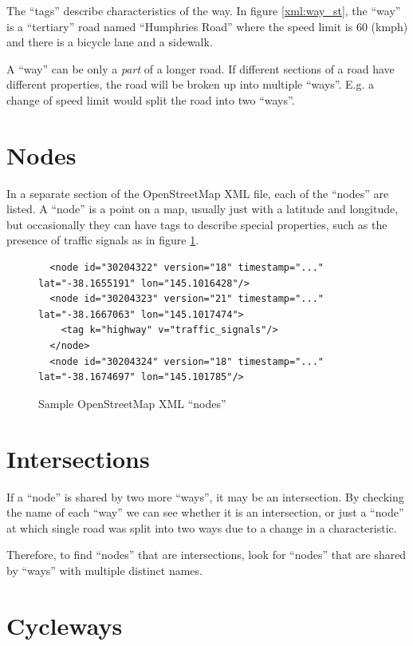 \documentclass[11pt,twoside]{report}
\begin{document}
The ``tags'' describe characteristics of the way.  In figure \ref{xml:way_st}, the ``way'' is a ``tertiary'' road named ``Humphries Road'' where the speed limit is 60 (kmph) and there is a bicycle lane and a sidewalk.

A ``way'' can be only a \textit{part} of a longer road.  If different sections of a road have different properties, the road will be broken up into multiple ``ways''.  E.g. a change of speed limit would split the road into two ``ways''.

\clearpage
\section{Nodes}
\label{osm:nodes}

In a separate section of the OpenStreetMap XML file, each of the ``nodes'' are listed.  A ``node'' is a point on a map, usually just with a latitude and longitude, but occasionally they can have tags to describe special properties, such as the presence of traffic signals as in figure \ref{xml:way_nodes}.\\

\begin{figure}[h]
\centering
\begin{verbatim}
  <node id="30204322" version="18" timestamp="..." lat="-38.1655191" lon="145.1016428"/>
  <node id="30204323" version="21" timestamp="..." lat="-38.1667063" lon="145.1017474">
    <tag k="highway" v="traffic_signals"/>
  </node>
  <node id="30204324" version="18" timestamp="..." lat="-38.1674697" lon="145.101785"/>	
\end{verbatim}
\caption{Sample OpenStreetMap XML ``nodes''}
\label{xml:way_nodes}
\end{figure}

\section{Intersections}
\label{osm:intersections}

If a ``node'' is shared by two more ``ways'', it may be an intersection.  By checking the name of each ``way'' we can see whether it is an intersection, or just a ``node'' at which single road was split into two ways due to a change in a characteristic.

Therefore, to find ``nodes'' that are intersections, look for ``nodes'' that are shared by ``ways'' with multiple distinct names.

\section{Cycleways}
\label{osm:cycleways}
\end{document}
